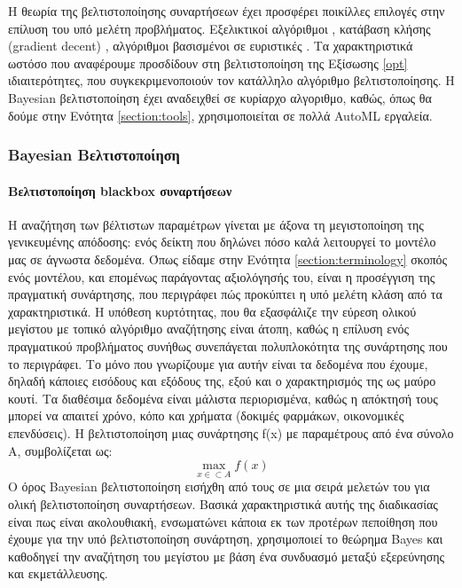	Η θεωρία της βελτιστοποίησης συναρτήσεων έχει προσφέρει ποικίλλες επιλογές στην επίλυση του υπό μελέτη προβλήματος. Eξελικτικοί αλγόριθμοι \citep{1554741}, κατάβαση κλήσης (gradient decent) \citep{wassenberg},  αλγόριθμοι βασισμένοι σε ευριστικές \citep{Nelder01011965, Huang2006}. Τα χαρακτηριστικά ωστόσο που αναφέρουμε προσδίδουν στη βελτιστοποίηση της Εξίσωσης \ref{opt} ιδιαιτερότητες, που συγκεκριμενοποιούν τον κατάλληλο αλγόριθμο βελτιστοποίησης. Η Bayesian βελτιστοποίηση έχει αναδειχθεί σε κυρίαρχο αλγοριθμο, καθώς, όπως θα δούμε στην Ενότητα \ref{section:tools}, χρησιμοποιείται σε πολλά \gls{AutoML} εργαλεία.
 \subsubsection{Bayesian Βελτιστοποίηση}
 	\paragraph{Βελτιστοποίηση blackbox συναρτήσεων} Η αναζήτηση των βέλτιστων παραμέτρων γίνεται με άξονα τη μεγιστοποίηση της γενικευμένης απόδοσης: ενός δείκτη που δηλώνει πόσο καλά λειτουργεί το μοντέλο μας σε άγνωστα δεδομένα. Όπως είδαμε στην Ενότητα \ref{section:terminology} σκοπός ενός μοντέλου, και επομένως παράγοντας αξιολόγησής του, είναι η προσέγγιση της πραγματική συνάρτησης, που περιγράφει πώς προκύπτει η υπό μελέτη κλάση από τα χαρακτηριστικά. Η υπόθεση κυρτότητας, που θα εξασφάλιζε την εύρεση ολικού μεγίστου με τοπικό αλγόριθμο αναζήτησης είναι άτοπη, καθώς η επίλυση ενός πραγματικού προβλήματος συνήθως συνεπάγεται πολυπλοκότητα της συνάρτησης που το περιγράφει. Το μόνο που γνωρίζουμε για αυτήν είναι τα δεδομένα που έχουμε, δηλαδή κάποιες εισόδους και εξόδους της, εξού και ο χαρακτηρισμός της ως μαύρο κουτί. Τα διαθέσιμα δεδομένα είναι μάλιστα περιορισμένα, καθώς η απόκτησή τους μπορεί να απαιτεί χρόνο, κόπο και χρήματα (δοκιμές φαρμάκων, οικονομικές επενδύσεις). Η βελτιστοποίηση μιας συνάρτησης f(x) με παραμέτρους από ένα σύνολο A, συμβολίζεται ως:
 \begin{equation}
 \max_{x \in \subset A } f(x)
 \end{equation}
 	Ο όρος Bayesian βελτιστοποίηση εισήχθη από τους \citet{Mockus1991} σε μια σειρά μελετών του για ολική βελτιστοποίηση συναρτήσεων. Βασικά χαρακτηριστικά αυτής της διαδικασίας είναι πως είναι ακολουθιακή, ενσωματώνει κάποια εκ των προτέρων πεποίθηση που έχουμε για την υπό βελτιστοποίηση συνάρτηση, χρησιμοποιεί το θεώρημα Bayes και καθοδηγεί την αναζήτηση του μεγίστου με βάση ένα συνδυασμό μεταξύ εξερεύνησης και εκμετάλλευσης.

